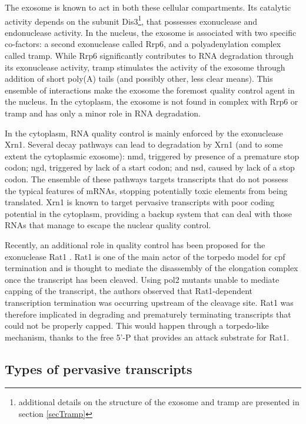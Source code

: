 The exosome is known to act in both these cellular compartments.
Its catalytic activity depends on the subunit Dis3\footnote{additional details on the structure of the exosome and \gls{tramp} are presented in section \ref{secTramp}}, that possesses \TtoF{} exonuclease and endonuclease activity.
In the nucleus, the exosome is associated with two specific co-factors: a second \TtoF{} exonuclease called Rrp6, and a polyadenylation complex called \gls{tramp}.
While Rrp6 significantly contributes to RNA degradation through its exonuclease activity, \gls{tramp} stimulates the activity of the exosome through addition of short poly(A) tails (and possibly other, less clear means).
This ensemble of interactions make the exosome the foremost quality control agent in the nucleus.
In the cytoplasm, the exosome is not found in complex with Rrp6 or \gls{tramp} and has only a minor role in RNA degradation.

In the cytoplasm, RNA quality control is mainly enforced by the \FtoT{} exonuclease Xrn1.
Several decay pathways can lead to degradation by Xrn1 (and to some extent the cytoplasmic exosome): \gls{nmd}, triggered by presence of a premature stop codon; \gls{ngd}, triggered by lack of a start codon; and \gls{nsd}, caused by lack of a stop codon.
The ensemble of these pathways targets transcripts that do not possess the typical features of mRNAs, stopping potentially toxic elements from being translated.
Xrn1 is known to target pervasive transcripts with poor coding potential in the cytoplasm, providing a backup system that can deal with those RNAs that manage to escape the nuclear quality control.

Recently, an additional role in quality control has been proposed for the \FtoT{} exonuclease Rat1 \cite{jimenogonzalez:2010:yeast}. 
Rat1 is one of the main actor of the torpedo model for \gls{cpf} termination and is thought to mediate the disassembly of the elongation complex once the transcript has been cleaved.
Using \gls{pol2} mutants unable to mediate capping of the transcript, the authors observed that Rat1-dependent transcription termination was occurring upstream of the cleavage site.
Rat1 was therefore implicated in degrading and prematurely terminating transcripts that could not be properly capped.
This would happen through a torpedo-like mechanism, thanks to the free 5'-P that provides an attack substrate for Rat1.

\subsection{Types of pervasive transcripts}

